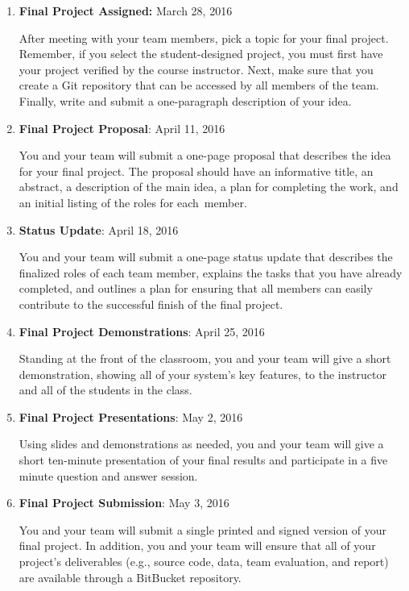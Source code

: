 \vspace*{-.05in}
\begin{enumerate}

  \itemsep0in

  \item {\bf Final Project Assigned:} March 28, 2016

    After meeting with your team members, pick a topic for your final project.  Remember, if you select the
    student-designed project, you must first have your project verified by the course instructor.  Next, make sure that
    you create a Git repository that can be accessed by all members of the team. Finally, write and submit a
    one-paragraph description of your idea.

  \item {\bf Final Project Proposal}: April 11, 2016

    You and your team will submit a one-page proposal that describes the idea for your final project.  The proposal
    should have an informative title, an abstract, a description of the main idea, a plan for completing the work, and
    an initial listing of the roles for \mbox{each member}.

  \item {\bf Status Update}: April 18, 2016

    You and your team will submit a one-page status update that describes the finalized roles of each team member,
    explains the tasks that you have already completed, and outlines a plan for ensuring that all members can easily
    contribute to the successful finish of the final project.

  \item {\bf Final Project Demonstrations}: April 25, 2016

    Standing at the front of the classroom, you and your team will give a short demonstration, showing all of your
    system's key features, to the instructor and all of the students in the class.

  \item {\bf Final Project Presentations}: May 2, 2016

    Using slides and demonstrations as needed, you and your team will give a short ten-minute presentation of your final
    results and participate in a five minute question and answer session.

  \item {\bf Final Project Submission}: May 3, 2016

    You and your team will submit a single printed and signed version of your final project. In addition, you and your
    team will ensure that all of your project's deliverables (e.g., source code, data, team evaluation, and report) are
    available through a BitBucket repository.

\end{enumerate}
\vspace*{-.05in}

